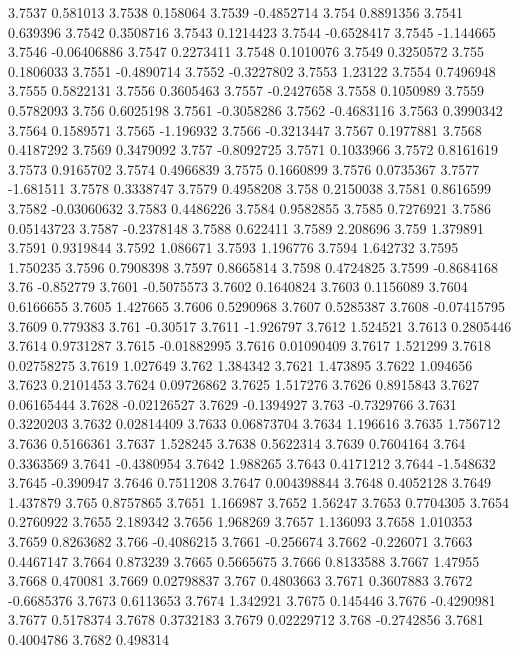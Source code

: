 3.7537  0.581013
3.7538  0.158064
3.7539  -0.4852714
3.754  0.8891356
3.7541  0.639396
3.7542  0.3508716
3.7543  0.1214423
3.7544  -0.6528417
3.7545  -1.144665
3.7546  -0.06406886
3.7547  0.2273411
3.7548  0.1010076
3.7549  0.3250572
3.755  0.1806033
3.7551  -0.4890714
3.7552  -0.3227802
3.7553  1.23122
3.7554  0.7496948
3.7555  0.5822131
3.7556  0.3605463
3.7557  -0.2427658
3.7558  0.1050989
3.7559  0.5782093
3.756  0.6025198
3.7561  -0.3058286
3.7562  -0.4683116
3.7563  0.3990342
3.7564  0.1589571
3.7565  -1.196932
3.7566  -0.3213447
3.7567  0.1977881
3.7568  0.4187292
3.7569  0.3479092
3.757  -0.8092725
3.7571  0.1033966
3.7572  0.8161619
3.7573  0.9165702
3.7574  0.4966839
3.7575  0.1660899
3.7576  0.0735367
3.7577  -1.681511
3.7578  0.3338747
3.7579  0.4958208
3.758  0.2150038
3.7581  0.8616599
3.7582  -0.03060632
3.7583  0.4486226
3.7584  0.9582855
3.7585  0.7276921
3.7586  0.05143723
3.7587  -0.2378148
3.7588  0.622411
3.7589  2.208696
3.759  1.379891
3.7591  0.9319844
3.7592  1.086671
3.7593  1.196776
3.7594  1.642732
3.7595  1.750235
3.7596  0.7908398
3.7597  0.8665814
3.7598  0.4724825
3.7599  -0.8684168
3.76  -0.852779
3.7601  -0.5075573
3.7602  0.1640824
3.7603  0.1156089
3.7604  0.6166655
3.7605  1.427665
3.7606  0.5290968
3.7607  0.5285387
3.7608  -0.07415795
3.7609  0.779383
3.761  -0.30517
3.7611  -1.926797
3.7612  1.524521
3.7613  0.2805446
3.7614  0.9731287
3.7615  -0.01882995
3.7616  0.01090409
3.7617  1.521299
3.7618  0.02758275
3.7619  1.027649
3.762  1.384342
3.7621  1.473895
3.7622  1.094656
3.7623  0.2101453
3.7624  0.09726862
3.7625  1.517276
3.7626  0.8915843
3.7627  0.06165444
3.7628  -0.02126527
3.7629  -0.1394927
3.763  -0.7329766
3.7631  0.3220203
3.7632  0.02814409
3.7633  0.06873704
3.7634  1.196616
3.7635  1.756712
3.7636  0.5166361
3.7637  1.528245
3.7638  0.5622314
3.7639  0.7604164
3.764  0.3363569
3.7641  -0.4380954
3.7642  1.988265
3.7643  0.4171212
3.7644  -1.548632
3.7645  -0.390947
3.7646  0.7511208
3.7647  0.004398844
3.7648  0.4052128
3.7649  1.437879
3.765  0.8757865
3.7651  1.166987
3.7652  1.56247
3.7653  0.7704305
3.7654  0.2760922
3.7655  2.189342
3.7656  1.968269
3.7657  1.136093
3.7658  1.010353
3.7659  0.8263682
3.766  -0.4086215
3.7661  -0.256674
3.7662  -0.226071
3.7663  0.4467147
3.7664  0.873239
3.7665  0.5665675
3.7666  0.8133588
3.7667  1.47955
3.7668  0.470081
3.7669  0.02798837
3.767  0.4803663
3.7671  0.3607883
3.7672  -0.6685376
3.7673  0.6113653
3.7674  1.342921
3.7675  0.145446
3.7676  -0.4290981
3.7677  0.5178374
3.7678  0.3732183
3.7679  0.02229712
3.768  -0.2742856
3.7681  0.4004786
3.7682  0.498314
